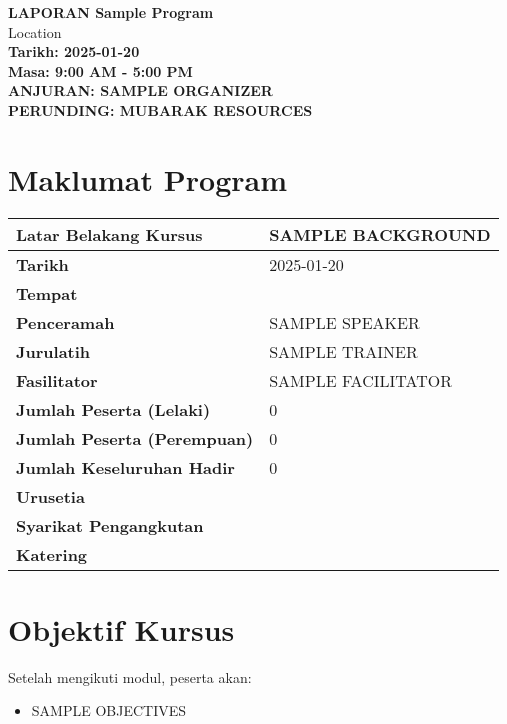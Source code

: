 \documentclass[a4paper,12pt]{article}
\begin{document}
\begin{center}
    \vspace*{1cm}
    \textbf{\huge LAPORAN Sample Program}\\
    \vspace{0.5cm}
    \textbfTest Location\\
    \vspace{0.5cm}
    \textbf{Tarikh: 2025-01-20}\\
    \vspace{0.5cm}
    \textbf{Masa: 9:00 AM - 5:00 PM}\\
    \vspace{1cm}
    \textbf{ANJURAN: SAMPLE ORGANIZER}\\
    \vspace{0.5cm}
    \textbf{PERUNDING: MUBARAK RESOURCES}
\end{center}

\tableofcontents
\newpage

\section{Maklumat Program}
\begin{tabular}{|l|l|}
    \hline
    \textbf{Latar Belakang Kursus} & SAMPLE BACKGROUND \\
    \hline
    \textbf{Tarikh} & 2025-01-20 \\
    \hline
    \textbf{Tempat} &  \\
    \hline
    \textbf{Penceramah} & SAMPLE SPEAKER \\
    \hline
    \textbf{Jurulatih} & SAMPLE TRAINER \\
    \hline
    \textbf{Fasilitator} & SAMPLE FACILITATOR \\
    \hline
    \textbf{Jumlah Peserta (Lelaki)} & 0 \\
    \hline
    \textbf{Jumlah Peserta (Perempuan)} & 0 \\
    \hline
    \textbf{Jumlah Keseluruhan Hadir} & 0 \\
    \hline
    \textbf{Urusetia} &  \\
    \hline
    \textbf{Syarikat Pengangkutan} &  \\
    \hline
    \textbf{Katering} &  \\
    \hline
\end{tabular}

\section{Objektif Kursus}
Setelah mengikuti modul, peserta akan:
\begin{itemize}
    \item SAMPLE OBJECTIVES
\end{itemize}
\end{document}
